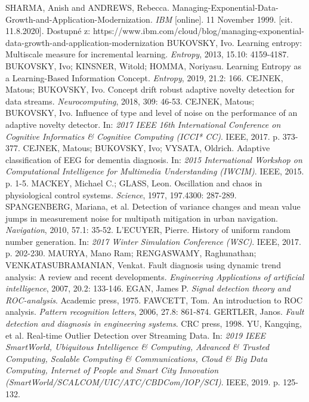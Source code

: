 \documentclass[11pt,twoside,openright]{report}
\begin{document}
\renewcommand{\bibname}{Literatura relevantní k tezím}
\begin{thebibliography}{L}
SHARMA, Anish and ANDREWS, Rebecca. Managing-Exponential-Data-Growth-and-Application-Modernization. \textit{IBM} [online]. 11 November 1999. [cit. 11.8.2020]. Dostupné z: https://www.ibm.com/cloud/blog/managing-exponential-data-growth-and-application-modernization 
BUKOVSKY, Ivo. Learning entropy: Multiscale measure for incremental learning. \textit{Entropy}, 2013, 15.10: 4159-4187.
BUKOVSKY, Ivo; KINSNER, Witold; HOMMA, Noriyasu. Learning Entropy as a Learning-Based Information Concept. \textit{Entropy}, 2019, 21.2: 166.
CEJNEK, Matous; BUKOVSKY, Ivo. Concept drift robust adaptive novelty detection for data streams. \textit{Neurocomputing}, 2018, 309: 46-53.
 CEJNEK, Matous; BUKOVSKY, Ivo. Influence of type and level of noise on the performance of an adaptive novelty detector. In: \textit{2017 IEEE 16th International Conference on Cognitive Informatics \& Cognitive Computing (ICCI* CC)}. IEEE, 2017. p. 373-377.
CEJNEK, Matous; BUKOVSKY, Ivo; VYSATA, Oldrich. Adaptive classification of EEG for dementia diagnosis. In: \textit{2015 International Workshop on Computational Intelligence for Multimedia Understanding (IWCIM)}. IEEE, 2015. p. 1-5.
MACKEY, Michael C.; GLASS, Leon. Oscillation and chaos in physiological control systems. \textit{Science}, 1977, 197.4300: 287-289.
SPANGENBERG, Mariana, et al. Detection of variance changes and mean value jumps in measurement noise for multipath mitigation in urban navigation. \textit{Navigation}, 2010, 57.1: 35-52.
L'ECUYER, Pierre. History of uniform random number generation. In: \textit{2017 Winter Simulation Conference (WSC)}. IEEE, 2017. p. 202-230.
MAURYA, Mano Ram; RENGASWAMY, Raghunathan; VENKATASUBRAMANIAN, Venkat. Fault diagnosis using dynamic trend analysis: A review and recent developments. \textit{Engineering Applications of artificial intelligence}, 2007, 20.2: 133-146.
EGAN, James P. \textit{Signal detection theory and ROC-analysis}. Academic press, 1975.
FAWCETT, Tom. An introduction to ROC analysis. \textit{Pattern recognition letters}, 2006, 27.8: 861-874.
GERTLER, Janos. \textit{Fault detection and diagnosis in engineering systems}. CRC press, 1998.
YU, Kangqing, et al. Real-time Outlier Detection over Streaming Data. In: \textit{2019 IEEE SmartWorld, Ubiquitous Intelligence \& Computing, Advanced \& Trusted Computing, Scalable Computing \& Communications, Cloud \& Big Data Computing, Internet of People and Smart City Innovation (SmartWorld/SCALCOM/UIC/ATC/CBDCom/IOP/SCI)}. IEEE, 2019. p. 125-132.

\end{thebibliography}
\end{document}

